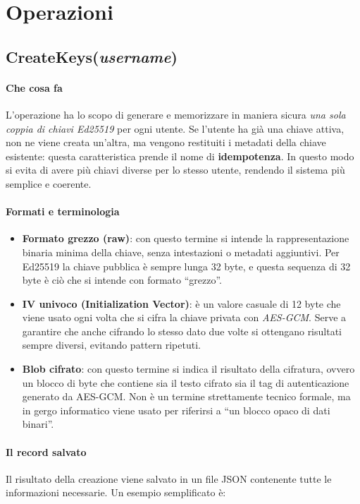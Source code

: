 \section{Operazioni}

\subsection{CreateKeys(\textit{username})}

\paragraph{Che cosa fa}
L’operazione ha lo scopo di generare e memorizzare in maniera sicura \emph{una sola coppia di chiavi Ed25519} per ogni utente. Se l’utente ha già una chiave attiva, non ne viene creata un’altra, ma vengono restituiti i metadati della chiave esistente: questa caratteristica prende il nome di \textbf{idempotenza}. In questo modo si evita di avere più chiavi diverse per lo stesso utente, rendendo il sistema più semplice e coerente.

\paragraph{Formati e terminologia}
\begin{itemize}
  \item \textbf{Formato grezzo (raw)}: con questo termine si intende la rappresentazione binaria minima della chiave, senza intestazioni o metadati aggiuntivi. Per Ed25519 la chiave pubblica è sempre lunga 32 byte, e questa sequenza di 32 byte è ciò che si intende con formato ``grezzo''.
  \item \textbf{IV univoco (Initialization Vector)}: è un valore casuale di 12 byte che viene usato ogni volta che si cifra la chiave privata con \emph{AES-GCM}. Serve a garantire che anche cifrando lo stesso dato due volte si ottengano risultati sempre diversi, evitando pattern ripetuti.
  \item \textbf{Blob cifrato}: con questo termine si indica il risultato della cifratura, ovvero un blocco di byte che contiene sia il testo cifrato sia il tag di autenticazione generato da AES-GCM. Non è un termine strettamente tecnico formale, ma in gergo informatico viene usato per riferirsi a ``un blocco opaco di dati binari''.
\end{itemize}

\paragraph{Il record salvato}
Il risultato della creazione viene salvato in un file JSON contenente tutte le informazioni necessarie. Un esempio semplificato è:

